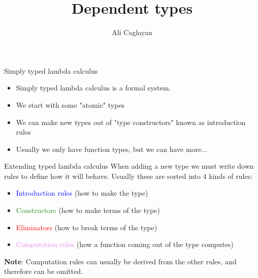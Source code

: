 \documentclass[usenames,dvipsnames]{beamer}
\title{Dependent types}
\author{Ali Caglayan}
\institute{University of Bath}
\newcommand{\blu}[1]{\textcolor{blue}{#1}}
\newcommand{\gre}[1]{\textcolor{ForestGreen}{#1}}
\newcommand{\red}[1]{\textcolor{red}{#1}}
\newcommand{\yel}[1]{\textcolor{violet}{#1}}
\begin{document}
    
    
    
    
    
    
    \begin{frame}{Simply typed lambda calculus}
        \begin{itemize}
            \item Simply typed lambda calculus is a formal system.
            \item We start with some "atomic" types
            \item We can make new types out of "type constructors" known as introduction rules
            \item Usually we only have function types, but we can have more...
        \end{itemize}
    \end{frame}
    
    \begin{frame}{Extending typed lambda calculus}
        When adding a new type we must write down rules to define how it will behave.
        Usually these are sorted into 4 kinds of rules:
        \begin{itemize}
            \item \blu{Introduction rules} (how to make the type)
            \item \gre{Constructors} (how to make terms of the type)
            \item \red{Eliminators} (how to break terms of the type)
            \item \yel{Computation rules} (how a function coming out of the type computes)
        \end{itemize}
        \textbf{Note}: Computation rules can usually be derived from the other rules, and therefore can be omitted.
    \end{frame}
\end{document}
